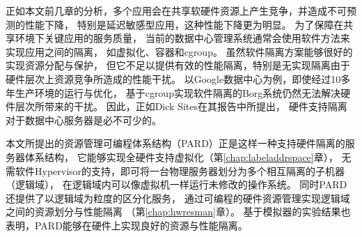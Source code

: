 %
%
正如本文前几章的分析，多个应用会在共享软硬件资源上产生竞争，并造成不可预测的性能下降，
特别是延迟敏感型应用，这种性能下降更为明显。
为了保障在共享环境下关键应用的服务质量，
当前的数据中心管理系统通常会使用软件方法来实现应用之间的隔离，
如虚拟化、容器和cgroup。
虽然软件隔离方案能够很好的实现资源分配与保护，
但它不足以提供有效的性能隔离，特别是无实现隔离由于硬件层次上资源竞争所造成的性能干扰。
以Google数据中心为例，即使经过10多年生产环境的运行与优化，
基于cgroup实现软件隔离的Borg系统仍然无法解决硬件层次所带来的干扰\cite{borg:2015}。
因此，正如Dick Sites在其报告\cite{Dick:2015}中所提出，
硬件支持隔离对于数据中心服务器是必不可少的。

本文所提出的资源管理可编程体系结构（PARD）正是这样一种支持硬件隔离的服务器体系结构，
它能够实现全硬件支持虚拟化（第\ref{chap:labeladdrspace}章），
无需软件Hypervisor的支持，即可将一台物理服务器划分为多个相互隔离的子机器（逻辑域），
在逻辑域内可以像虚拟机一样运行未修改的操作系统。
同时PARD还提供了以逻辑域为粒度的区分化服务，
通过可编程的硬件资源管理实现逻辑域之间的资源划分与性能隔离
（第\ref{chap:hwresman}章）。
基于模拟器的实验结果也表明，PARD能够在硬件上实现良好的资源与性能隔离。


